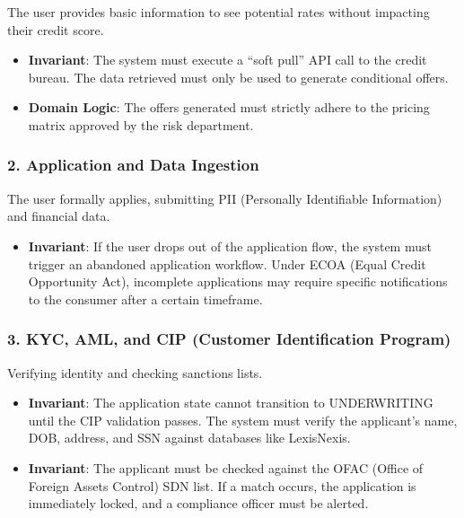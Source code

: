 \documentclass[
  11pt,
  openany,
  oneside]{book}
\providecommand{\tightlist}{%
  \setlength{\itemsep}{0pt}\setlength{\parskip}{0pt}}
\begin{document}
The user provides basic information to see potential rates without
impacting their credit score.

\begin{itemize}
\tightlist
\item
  \textbf{Invariant}: The system must execute a ``soft pull'' API call
  to the credit bureau. The data retrieved must only be used to generate
  conditional offers.
\item
  \textbf{Domain Logic}: The offers generated must strictly adhere to
  the pricing matrix approved by the risk department.
\end{itemize}

\subsubsection{2. Application and Data
Ingestion}\label{application-and-data-ingestion}

The user formally applies, submitting PII (Personally Identifiable
Information) and financial data.

\begin{itemize}
\tightlist
\item
  \textbf{Invariant}: If the user drops out of the application flow, the
  system must trigger an abandoned application workflow. Under ECOA
  (Equal Credit Opportunity Act), incomplete applications may require
  specific notifications to the consumer after a certain timeframe.
\end{itemize}

\subsubsection{3. KYC, AML, and CIP (Customer Identification
Program)}\label{kyc-aml-and-cip-customer-identification-program}

Verifying identity and checking sanctions lists.

\begin{itemize}
\tightlist
\item
  \textbf{Invariant}: The application state cannot transition to
  UNDERWRITING until the CIP validation passes. The system must verify
  the applicant's name, DOB, address, and SSN against databases like
  LexisNexis.
\item
  \textbf{Invariant}: The applicant must be checked against the OFAC
  (Office of Foreign Assets Control) SDN list. If a match occurs, the
  application is immediately locked, and a compliance officer must be
  alerted.
\end{itemize}
\end{document}

